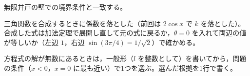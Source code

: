 無限井戸の壁での境界条件と一致する。
\item {} 三角関数を合成するときに係数を落とした（前回は $2\cos x$ で $k$ を落とした）。合成した式は加法定理で展開し直して元の式に戻るか，$\theta=0$ を入れて両辺の値が等しいか（左辺 $1$，右辺 $\sin(3\pi/4)=1/\sqrt{2}$）で確かめる。
\item {} 方程式の解が無数にあるときは，一般形（$l$ を整数として）を書いてから，問題の条件（$x<0$，$x=0$ に最も近い）で1つを選ぶ。選んだ根拠を1行で書く。
